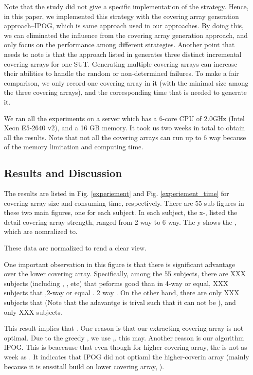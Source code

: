 \documentclass[conference]{IEEEtran}
\theoremstyle{definition}
\begin{document}
Note that the study \cite{fouche2009incremental} did not give a specific implementation of the strategy. Hence, in this paper, we implemented this strategy with the covering array generation approach--IPOG, which is same approach used in our approaches.  By doing this, we can eliminated the influence from the covering array generation approach, and only focus on the performance among different strategies. Another point that needs to note is that the approach listed in \cite{fouche2009incremental} generates three distinct incremental covering arrays for one SUT. Generating multiple covering arrays can increase their abilities to handle the random or non-determined failures. To make a fair comparison, we only record one covering array in it (with the minimal size among the three covering arrays), and the corresponding time that is needed to generate it.

We ran all the experiments on a server which has a 6-core CPU of 2.0GHz (Intel Xeon E5-2640 v2), and a 16 GB memory. It took us two weeks in total to obtain all the results. Note that not all the covering arrays can run up to 6 way because of the memory limitation and computing time.
\subsection{Results and Discussion}
The results are listed in Fig. \ref{experiement} and Fig. \ref{experiement_time} for covering array size and consuming time, respectively. There are 55 sub figures in these two main figures, one for each subject. In each subject, the x-, listed the detail covering array strength, ranged from 2-way to 6-way. The y shows the , which are nomralized to.

These data are normalized to rend a clear view.

One important observation in this figure is that there is significant advantage over the lower covering array. Specifically, among the 55 subjects, there are XXX subjects (including  , , etc) that peforms good than in 4-way or equal, XXX subjects that ,2-way or equal . 2 way . On the other hand, there are only XXX subjects that (Note that the adavantge is trival such that it can not be ), and only XXX subjects.

This result implies that . One reason is that our extracting covering array is not optimal. Due to the greedy , we use ,. this may. Another reason is our algorithm IPOG. This is beaccause that even though for higher-covering array, the is not as week as . It indicates that IPOG did not optiaml the higher-coverin array (mainly because it is enssitall build on lower covering array, ).
\end{document}
